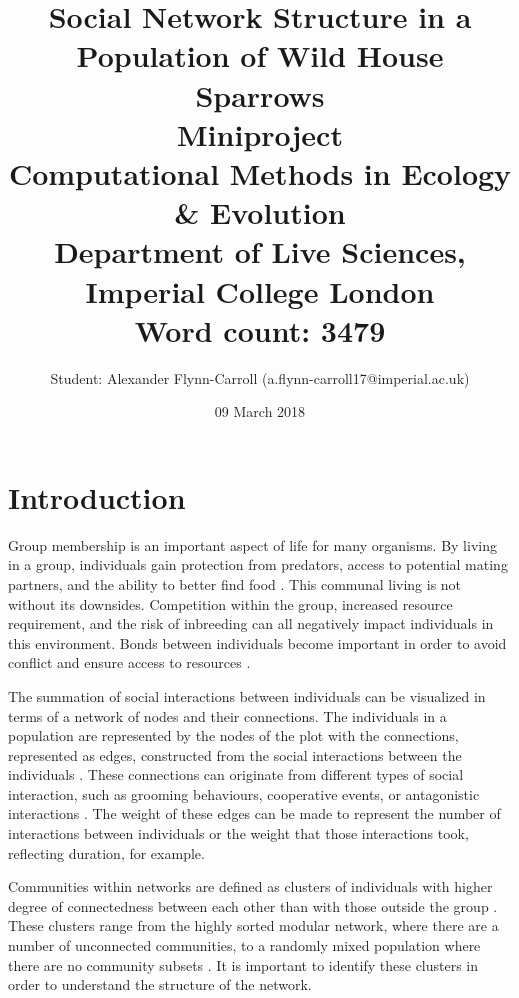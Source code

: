 \documentclass[11pt]{article}
\title{\textbf{Social Network Structure in a Population of Wild House Sparrows\\ \bigskip \large Miniproject\\ Computational Methods in Ecology \& Evolution\\ Department of Live Sciences, Imperial College London\\ \bigskip Word count: 3479}}
\author{Student: Alexander Flynn-Carroll (a.flynn-carroll17@imperial.ac.uk)}
\date{09 March 2018}
\begin{document}
\begin{titlepage}
\maketitle
\end{titlepage}

\linenumbers
\pagestyle{headings}
\setcounter{page}{1}

\section{Introduction}
\par Group membership is an important aspect of life for many organisms.  By living in a group, individuals gain protection from predators, access to potential mating partners, and the ability to better find food \citep{ETH:ETH922}⁠.  This communal living is not without its downsides.  Competition within the group, increased resource requirement, and the risk of inbreeding can all negatively impact individuals in this environment.   Bonds between individuals become important in order to avoid conflict and ensure access to resources  \citep{Clutton-Brock2009}.
\par The summation of social interactions between individuals can be visualized in terms of a network of nodes and their connections.  The individuals in a population are represented by the nodes of the plot with the connections, represented as edges, constructed from the social interactions between the individuals \citep{WEY2008333}⁠.  These connections can originate from different types of social interaction, such as grooming behaviours, cooperative events, or antagonistic interactions \citep{KULAHCI2018217}⁠.  The weight of these edges can be made to represent the number of interactions between individuals or the weight that those interactions took, reflecting duration, for example.  
\par Communities within networks are defined as clusters of individuals with higher degree of connectedness between each other than with those outside the group \citep{Newman2003}⁠.  These clusters range from the highly sorted modular network, where there are a number of unconnected communities, to a randomly mixed population where there are no community subsets \citep{SHIZUKA2016237}⁠.  It is important to identify these clusters in order to understand the structure of the network.  
\end{document}
